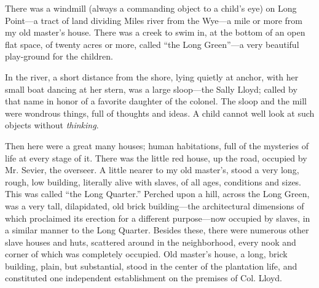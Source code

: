 There was a windmill (always a commanding object to a child's eye) on
Long Point---a tract of land dividing Miles river from the Wye---a mile
or more from my old master's house. There was a creek to swim in, at the
bottom of an open flat space, of twenty acres or more, called ``the Long
Green''---a very beautiful play-ground for the children.

In the river, a short distance from the shore, lying quietly at anchor,
with her small boat dancing at her {}stern, was a large sloop---the
Sally Lloyd; called by that name in honor of a favorite daughter of the
colonel. The sloop and the mill were wondrous things, full of thoughts
and ideas. A child cannot well look at such objects without
\emph{thinking}.

Then here were a great many houses; human habitations, full of the
mysteries of life at every stage of it. There was the little red house,
up the road, occupied by Mr. Sevier, the overseer. A little nearer to my
old master's, stood a very long, rough, low building, literally alive
with slaves, of all ages, conditions and sizes. This was called ``the
Long Quarter.'' Perched upon a hill, across the Long Green, was a very
tall, dilapidated, old brick building---the architectural dimensions of
which proclaimed its erection for a different purpose---now occupied by
slaves, in a similar manner to the Long Quarter. Besides these, there
were numerous other slave houses and huts, scattered around in the
neighborhood, every nook and corner of which was completely occupied.
Old master's house, a long, brick building, plain, but substantial,
stood in the center of the plantation life, and constituted one
independent establishment on the premises of Col. Lloyd.

